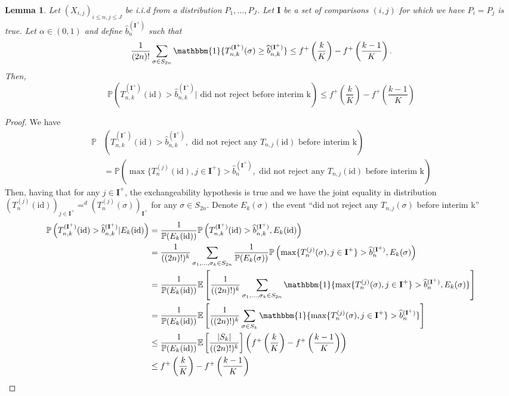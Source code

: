 \documentclass{article}
\theoremstyle{plain}
\newtheorem{Lemma}{Lemma}
\theoremstyle{remark}
\renewcommand{\P}{\mathbb{P}}
\newcommand{\E}{\mathbb{E}}
\newcommand{\1}{\mathbbm{1}}
\newcommand{\id}{\mathrm{id}}
\numberwithin{equation}{section}
\begin{document}
\begin{Lemma}
Let $(X_{i,j})_{i\le n, j\le J}$ be i.i.d from a distribution $P_1,\dots,P_J$. Let $\textbf{I}$ be a set of comparisons $(i,j)$ for which we have $P_i=P_j$ is true. Let $\alpha \in (0,1)$ and define $\widehat{b}_{n}^{(\textbf{I}^+)}$ such that 
$$ \frac{1}{(2n)!}\sum_{\sigma \in S_{2n}} \1\{T_{n,k}^{(\textbf{I}^+)}(\sigma) \ge  \widehat{b}_{n,k}^{(\textbf{I}^+)}\} \le  f^{+}\left(\frac{k}{K}\right)- f^{+}\left(\frac{k-1}{K}\right).$$
Then, 
$$\P\left(T_{n,k}^{(\textbf{I}^+)}(\id) > \widehat{b}_{n,k}^{(\textbf{I}^+)} |  \text{ did not reject before interim k}\right)\le f^{+}\left(\frac{k}{K}\right)- f^{+}\left(\frac{k-1}{K}\right) $$ 
\end{Lemma}
\begin{proof}
We have
\begin{align*}
\P&\left(T_{n,k}^{(\textbf{I}^+)}(\id) > \widehat{b}_{n,k}^{(\textbf{I}^+)} ,  \text{ did not reject any $T_{n,j}(\id)$ before interim k} \right)\\
&= \P\left(\max\{T_{n}^{(j)}(\id), j \in \textbf{I}^+\} > \widehat{b}_{n}^{(\textbf{I}^+)},  \text{ did not reject any $T_{n,j}(\id)$ before interim k} \right)
\end{align*}
Then, having that for any $j \in \textbf{I}^+$, the exchangeability hypothesis is true and we have the joint equality in distribution $(T_n^{(j)}(\id))_{j \in\textbf{I}^+} =^d (T_n^{(j)}(\sigma))_{\textbf{I}^+}$ for any $\sigma \in S_{2n}$. Denote $E_k(\sigma)$ the event  ``did not reject any $T_{n,j}(\sigma)$ before interim k''
\begin{align*}
\P\left(T_{n,k}^{(\textbf{I}^+)}(\id) > \widehat{b}_{n,k}^{(\textbf{I}^+)} |  E_k(\id) \right)&= \frac{1}{\P(E_k(\id))}\P\left(T_{n,k}^{(\textbf{I}^+)}(\id) > \widehat{b}_{n,k}^{(\textbf{I}^+)} ,  E_k(\id) \right)\\
&= \frac{1}{((2n)!)^k}\sum_{\sigma_1,\dots,\sigma_k \in S_{2n}} \frac{1}{\P(E_k(\sigma))}\P\left(\max\{T_{n}^{(j)}(\sigma), j \in \textbf{I}^+\} > \widehat{b}_{n}^{(\textbf{I}^+)},  E_k(\sigma) \right)\\
&= \frac{1}{\P(E_k(\id))}\E\left[\frac{1}{((2n)!)^k}\sum_{\sigma_1,\dots,\sigma_k \in S_{2n}} \1\{\max\{T_{n}^{(j)}(\sigma), j \in \textbf{I}^+\} > \widehat{b}_{n}^{(\textbf{I}^+)},  E_k(\sigma)\} \right]\\
&= \frac{1}{\P(E_k(\id))}\E\left[\frac{1}{((2n)!)^k}\sum_{\sigma \in S_k} \1\{\max\{T_{n}^{(j)}(\sigma), j \in \textbf{I}^+\} > \widehat{b}_{n}^{(\textbf{I}^+)}\} \right]\\
&\le  \frac{1}{\P(E_k(\id))}\E\left[\frac{|S_k|}{((2n)!)^k} \right]\left(f^{+}\left(\frac{k}{K}\right)- f^{+}\left(\frac{k-1}{K}\right)\right)\\
&\le f^{+}\left(\frac{k}{K}\right)- f^{+}\left(\frac{k-1}{K}\right)
\end{align*}
\end{proof}
\end{document}
